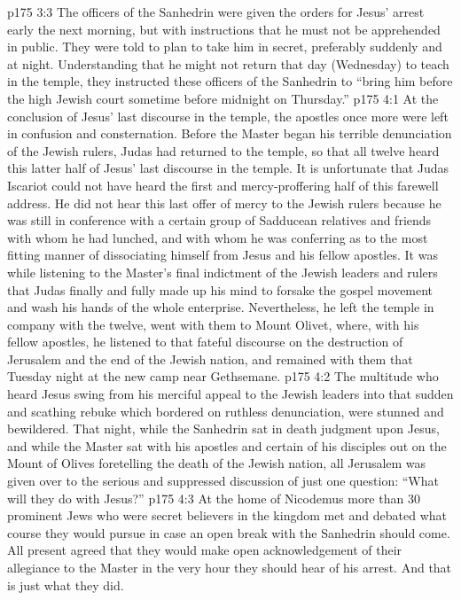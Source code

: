 \vs p175 3:3 The officers of the Sanhedrin were given the orders for Jesus’ arrest early the next morning, but with instructions that he must not be apprehended in public. They were told to plan to take him in secret, preferably suddenly and at night. Understanding that he might not return that day (Wednesday) to teach in the temple, they instructed these officers of the Sanhedrin to “bring him before the high Jewish court sometime before midnight on Thursday.”
\vs p175 4:1 At the conclusion of Jesus’ last discourse in the temple, the apostles once more were left in confusion and consternation. Before the Master began his terrible denunciation of the Jewish rulers, Judas had returned to the temple, so that all twelve heard this latter half of Jesus’ last discourse in the temple. It is unfortunate that Judas Iscariot could not have heard the first and mercy\hyp{}proffering half of this farewell address. He did not hear this last offer of mercy to the Jewish rulers because he was still in conference with a certain group of Sadducean relatives and friends with whom he had lunched, and with whom he was conferring as to the most fitting manner of dissociating himself from Jesus and his fellow apostles. It was while listening to the Master’s final indictment of the Jewish leaders and rulers that Judas finally and fully made up his mind to forsake the gospel movement and wash his hands of the whole enterprise. Nevertheless, he left the temple in company with the twelve, went with them to Mount Olivet, where, with his fellow apostles, he listened to that fateful discourse on the destruction of Jerusalem and the end of the Jewish nation, and remained with them that Tuesday night at the new camp near Gethsemane.
\vs p175 4:2 \pc The multitude who heard Jesus swing from his merciful appeal to the Jewish leaders into that sudden and scathing rebuke which bordered on ruthless denunciation, were stunned and bewildered. That night, while the Sanhedrin sat in death judgment upon Jesus, and while the Master sat with his apostles and certain of his disciples out on the Mount of Olives foretelling the death of the Jewish nation, all Jerusalem was given over to the serious and suppressed discussion of just one question: “What will they do with Jesus?”
\vs p175 4:3 \pc At the home of Nicodemus more than 30 prominent Jews who were secret believers in the kingdom met and debated what course they would pursue in case an open break with the Sanhedrin should come. All present agreed that they would make open acknowledgement of their allegiance to the Master in the very hour they should hear of his arrest. And that is just what they did.
